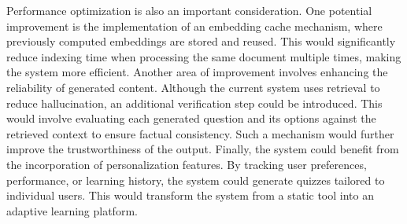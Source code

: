 \documentclass[12pt,a4paper]{report}
\begin{document}
Performance optimization is also an important consideration. One potential improvement is the implementation of an embedding cache mechanism, where previously computed embeddings are stored and reused. This would significantly reduce indexing time when processing the same document multiple times, making the system more efficient.
Another area of improvement involves enhancing the reliability of generated content. Although the current system uses retrieval to reduce hallucination, an additional verification step could be introduced. This would involve evaluating each generated question and its options against the retrieved context to ensure factual consistency. Such a mechanism would further improve the trustworthiness of the output.
Finally, the system could benefit from the incorporation of personalization features. By tracking user preferences, performance, or learning history, the system could generate quizzes tailored to individual users. This would transform the system from a static tool into an adaptive learning platform.
\end{document}
